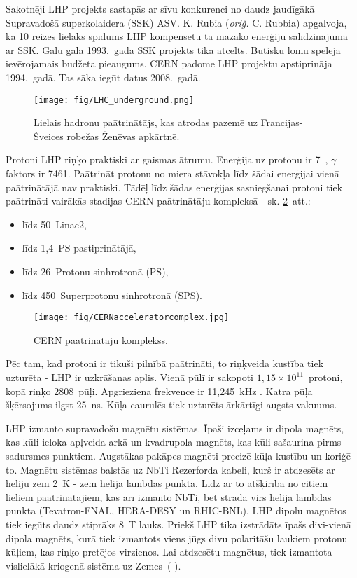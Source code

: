 Sakotnēji LHP projekts sastapās ar sīvu konkurenci no daudz jaudīgākā Supravadošā superkolaidera (SSK) ASV. K. Rubia (\textit{oriģ.} C. Rubbia) apgalvoja, ka 10 reizes lielāks spīdums LHP kompensētu tā mazāko enerģiju salīdzinājumā ar SSK. Galu galā 1993.~gadā SSK projekts tika atcelts. Būtisku lomu spēlēja ievērojamais budžeta pieaugums. CERN padome LHP projektu apstiprināja 1994.~gadā. Tas sāka iegūt datus 2008.~gadā.

\begin{figure}[htpb]
  \centering
  \texttt{[image: fig/LHC\_underground.png]}
  \caption{Lielais hadronu paātrinātājs, kas atrodas pazemē uz Francijas-Šveices robežas Ženēvas apkārtnē.}
  \label{fig:LHC_underground}
\end{figure}

Protoni LHP riņķo praktiski ar gaismas ātrumu. Enerģija uz protonu ir 7~\TeV, $\gamma$ faktors ir 7461. Paātrināt protonu no miera stāvokļa līdz šādai enerģijai vienā paātrinātājā nav praktiski. Tādēļ līdz šādas enerģijas sasniegšanai protoni tiek paātrināti vairākās stadijas CERN paātrinātāju kompleksā - sk. \ref{fig:CERN_accelerator_complex}~att.:

\begin{itemize}
\item līdz 50~\MeV Linac2,
\item līdz 1,4~\GeV PS \gls{pastiprinātājā},
\item līdz 26~\GeV Protonu sinhrotronā (PS),
\item līdz 450~\GeV Superprotonu sinhrotronā (SPS).
\end{itemize}

\begin{figure}[htpb]
  \centering
  \texttt{[image: fig/CERNacceleratorcomplex.jpg]}
  \caption{CERN paātrinātāju komplekss.}
  \label{fig:CERN_accelerator_complex}
\end{figure}

Pēc tam, kad protoni ir tikuši pilnībā paātrināti, to riņķveida kustība tiek uzturēta - LHP ir \gls{uzkrāšanas aplis}. Vienā \gls{pūlī} ir sakopoti $1,15\times10^{11}$~protoni, kopā riņķo 2808~pūļi. Apgrieziena frekvence ir 11,245~kHz \cite{Bruning:2004ej}. Katra pūļa šķērsojums ilgst 25~ns. Kūļa caurulēs tiek uzturēts ārkārtīgi augsts vakuums.

LHP izmanto supravadošu magnētu sistēmas. Īpaši izceļams ir dipola magnēts, kas kūli ieloka apļveida arkā un kvadrupola magnēts, kas kūli sašaurina pirms sadursmes punktiem. Augstākas pakāpes magnēti precizē kūļa kustību un koriģē to. Magnētu sistēmas balstās uz NbTi Rezerforda kabeli, kurš ir atdzesēts ar heliju zem 2~K - zem helija lambdas punkta. Līdz ar to atšķirībā no citiem lieliem paātrinātājiem, kas arī izmanto NbTi, bet strādā virs helija lambdas punkta (Tevatron-FNAL, HERA-DESY un RHIC-BNL), LHP dipolu magnētos tiek iegūts daudz stiprāks 8~T lauks. Priekš LHP tika izstrādāts īpašs divi-vienā dipola magnēts, kurā tiek izmantots viens jūgs divu polaritāšu laukiem protonu kūļiem, kas riņķo pretējos virzienos. Lai atdzesētu magnētus, tiek izmantota vislielākā kriogenā sistēma uz Zemes~( \cite{MYERS:2013hra} \cite{Evans:2008zzb}).

